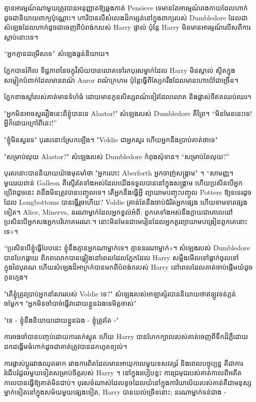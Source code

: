 {\begin{em}
គ្មានអារម្មណ៍ណាមួយត្រូវបានអនុញ្ញាតឱ្យឆ្លងកាត់ Pensieve ទេមានតែអារម្មណ៍រាងកាយដែលហាក់ដូចជានិយាយពាក្យប៉ុណ្ណោះ។ ហារីបានលឺសំលេងដ៏កម្សត់នៅក្នុងពាក្យរបស់ Dumbledore ដែលជាសំឡេងដែលហាក់ដូចជាចេញពីបំពង់ករបស់ Harry ផ្ទាល់ ប៉ុន្តែ Harry មិនមានអារម្មណ៍លើសពីការស្តាប់នោះទេ។

“អ្នក​គ្មាន​ជម្រើស​ទេ” សំឡេង​ធ្ងន់​និយាយ។

ភ្នែកបានរំកិល ទិដ្ឋភាពនៃចក្ខុវិស័យបានលោតទៅរកបុរសម្នាក់ដែល Harry មិនស្គាល់ ស្ថិតក្នុងសម្លៀកបំពាក់ដែលមានពណ៌ Auror ពណ៌ក្រហម ប៉ុន្តែធ្វើពីស្បែករឹងដែលមានហោប៉ៅជាច្រើន។

ភ្នែកខាងស្តាំរបស់គាត់មានទំហំធំ ដោយមានកូនសិស្សពណ៌ខៀវដែលលោត និងផ្លាស់ទីឥតឈប់ឈរ។

"អ្នកមិនអាចសួររឿងនេះពីខ្ញុំបានទេ Alastor!" សំឡេងរបស់ Dumbledore គឺព្រៃ។ “មិនមែននេះទេ! អ្វីក៏ដោយក្រៅពីនេះ!”

"ខ្ញុំមិនសួរទេ" បុរសនោះស្រែកឡើង។ "Voldie ជាអ្នកសួរ ហើយអ្នកនឹងប្រាប់គាត់ថាទេ"

"សម្រាប់លុយ Alastor?" សំឡេងរបស់ Dumbledore កំពុងសុំទាន។ “សម្រាប់តែលុយ?”

បុរសនោះបាននិយាយយ៉ាងមុតមាំថា "អ្នកលោះ Aberforth អ្នកចាញ់សង្រ្គាម" ។ “សាមញ្ញ។ មួយរយពាន់ Galleon គឺស្ទើរតែទាំងអស់ដែលយើងទទួលបាននៅក្នុងសង្រ្គាម ហើយប្រសិនបើអ្នកប្រើវាដូចនេះ វានឹងមិនត្រូវបានបញ្ចូលទេ។ តើអ្នកនឹងធ្វើអ្វី ព្យាយាមបញ្ចុះបញ្ចូល Potters ឱ្យទទេរដូចដែល Longbottoms បានធ្វើរួចហើយ? Voldie គ្រាន់​តែ​នឹង​ចាប់​ជំរិត​អ្នក​ផ្សេង ហើយ​ទាមទារ​ផ្សេង​ទៀត។ Alice, Minerva, នរណាម្នាក់ដែលអ្នកខ្វល់អំពី, ពួកគេទាំងអស់នឹងក្លាយជាគោលដៅប្រសិនបើអ្នកសងអ្នកបរិភោគមរណៈ។ នោះ​មិន​មែន​ជា​មេរៀន​ដែល​អ្នក​គួរ​ព្យាយាម​បង្រៀន​ពួកគេ​នោះ​ទេ»។

“ប្រសិនបើខ្ញុំធ្វើបែបនេះ ខ្ញុំនឹងគ្មានអ្នកណាម្នាក់ទេ។ គ្មាន​នរណា​ម្នាក់»។ សំឡេងរបស់ Dumbledore បានបែកធ្លាយ ពិភពលោកបានផ្អៀងនៅពេលដែលភ្នែកដែល Harry សម្លឹងមើលទៅធ្លាក់ចូលទៅក្នុងដៃបុរាណ ហើយសំឡេងដ៏អាក្រក់បានមកពីបំពង់ករបស់ Harry នៅពេលដែលគាត់ចាប់ផ្តើមយំដូចកូនក្មេង។

"តើខ្ញុំត្រូវប្រាប់អ្នកនាំសាររបស់ Voldie ទេ?" សំឡេង​របស់​អាឡាស្ទ័រ​បាន​និយាយ​ថា​ឥឡូវ​ទន់ភ្លន់​ចម្លែក។ "អ្នកមិនចាំបាច់ធ្វើវាដោយខ្លួនឯងទេមិត្តចាស់"

"ទេ - ខ្ញុំនឹងនិយាយដោយខ្លួនឯង - ខ្ញុំត្រូវតែ -"
\end{em}

\later

ការចងចាំបានបញ្ចប់ដោយការតក់ស្លុត ហើយ Harry បានហែកក្បាលរបស់គាត់ចេញពីទឹកដ៏ភ្លឺដោយដកដង្ហើមធំហាក់ដូចជាគាត់ត្រូវបានដកហូតខ្យល់។

ការផ្លាស់ប្តូររវាងឈុតឆាក រវាងការពិតដែលមានអាយុកាលមួយទសវត្សរ៍ និងពេលបច្ចុប្បន្ន គឺជាការរំជើបរំជួលមួយទៀតសម្រាប់ចិត្តរបស់ Harry ។ នៅក្នុងរបៀបខ្លះ ការជ្រមុជរបស់គាត់កាលពីអតីតកាលបានធ្វើឱ្យគាត់មិនជាប់។ បុរសចំណាស់ដែលខូចដែលយំនៅក្នុងការិយាល័យរបស់គាត់គឺជាមនុស្សម្នាក់ទៀតនៅក្នុងសម័យមួយផ្សេងទៀត, Harry បានយល់ច្រើននោះ; នរណាម្នាក់ទន់ជាង -

}
